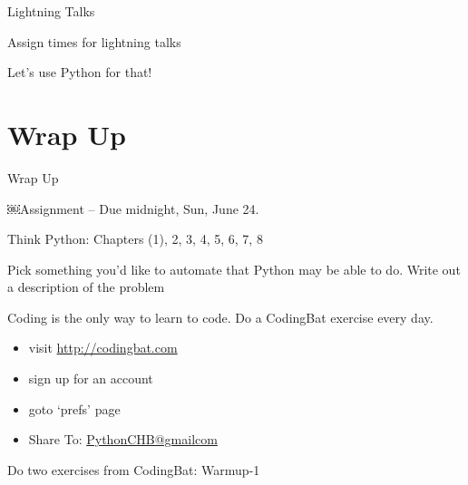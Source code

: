 \documentclass{beamer}
\begin{document}
\begin{frame}{Lightning Talks}

\vspace{0.5in}
{\Large Assign times for lightning talks}

\vspace{0.5in}
{\center \large Let's use Python for that!} 

\end{frame}

\section{Wrap Up}

\begin{frame}[fragile]{Wrap Up}

{\Large￼Assignment -- Due midnight, Sun, June 24.}

\vspace{0.15in}
Think Python: Chapters (1), 2, 3, 4, 5, 6, 7, 8

\vspace{0.15in}
Pick something you'd like to automate that Python may be able to do. Write out a description of the problem


\vspace{0.15in}
Coding is the only way to learn to code. Do a CodingBat exercise every day.
\begin{itemize}
  \item visit \url{http://codingbat.com}
  \item sign up for an account
  \item goto ‘prefs’ page
  \item Share To: \url{PythonCHB@gmailcom}
\end{itemize}

Do two exercises from CodingBat: Warmup-1 

\end{frame}
\end{document}
